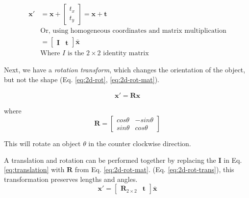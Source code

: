 \begin{equation}
    \begin{aligned}
        \mathbf{x'} &= \mathbf{x} + \begin{bmatrix}
            t_x \\ t_y
        \end{bmatrix} = \mathbf{x} + \mathbf{t}\\
        &\text{Or, using homogeneous coordinates and matrix multiplication} \\
        &= \begin{bmatrix}
            \mathbf{I} & \mathbf{t}
        \end{bmatrix}\bar{\mathbf{x}} \\
        &\text{Where $I$ is the $2 \times 2$ identity matrix}
    \end{aligned}
    \label{eq:translation}
\end{equation}

Next, we have a \emph{rotation transform}, which changes the orientation of the object, but not the shape (Eq. \ref{eq:2d-rot}, \ref{eq:2d-rot-mat}). 

\begin{equation}
    \begin{aligned}
        \mathbf{x}' = \mathbf{Rx}
    \end{aligned}
    \label{eq:2d-rot}
\end{equation}

where
\begin{equation}
    \mathbf{R} = \begin{bmatrix}
        cos\theta & -sin \theta \\ sin \theta & cos \theta 
    \end{bmatrix}
    \label{eq:2d-rot-mat}
\end{equation}

This will rotate an object $\theta$ in the counter clockwise direction. 

A translation and rotation can be performed together by replacing the $\mathbf{I}$ in Eq. \ref{eq:translation} with $\mathbf{R}$ from Eq. \ref{eq:2d-rot-mat}. (Eq. \ref{eq:2d-rot-trans}), this transformation preserves lengths and angles.
\begin{equation}
    \mathbf{x}' = \begin{bmatrix}
        \mathbf{R}_{2 \times 2} & \mathbf{t}
    \end{bmatrix} \bar{\mathbf{x}}
    \label{eq:2d-rot-trans}
\end{equation}


